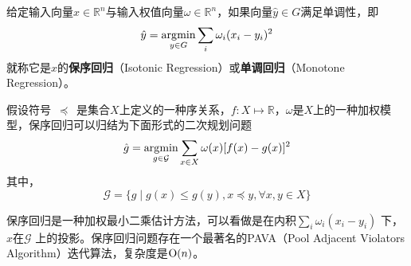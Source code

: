 给定输入向量$x\in \mathbb{R}^n$与输入权值向量$\omega\in \mathbb R^n$，如果向量$\hat y\in G$满足单调性，即
\begin{equation}
    \hat y = \operatorname*{\mathrm{\arg\!\min}}\limits_{y\in G} \sum\limits_i \omega_i(x_i - y_i)^2
\end{equation}
就称它是$x$的\textbf{保序回归}（Isotonic Regression）或\textbf{单调回归}（Monotone Regression）。

假设符号~$\preccurlyeq$~是集合$X$上定义的一种序关系，$f:X\mapsto \mathbb{R}$，$\omega$是$X$上的一种加权模型，保序回归可以归结为下面形式的二次规划问题
\begin{equation}
    \hat{g} = \operatorname*{\mathrm{\arg\!\min}}\limits_{g\in \mathcal{G}} \sum\limits_{x\in X} \omega(x) [f(x)-g(x)]^2
\end{equation}
其中，
\begin{equation}
    \mathcal{G} = \{ g \mid g(x) \le g(y), x \preccurlyeq y, \forall x,y\in X\}
\end{equation}

保序回归是一种加权最小二乘估计方法，可以看做是在内积$\sum\limits_i \omega_i(x_i - y_i)$ 下，$x$在$\mathcal{G}$ 上的投影。保序回归问题存在一个最著名的PAVA（Pool Adjacent Violators Algorithm）\cite{barlow1972statistical,de2009isotone}迭代算法，复杂度是$\operatorname{\mathrm{O}}(n)$。

